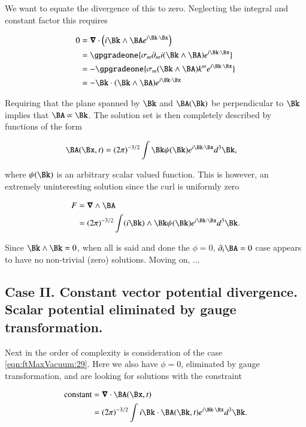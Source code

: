 We want to equate the divergence of this to zero.  Neglecting the integral and constant factor this requires

\begin{align*}
0 
&= 
\spacegrad \cdot \left( i \Bk \wedge \BA e^{i\Bk \cdot \Bx} \right) \\
&= 
\gpgradeone{ \sigma_m \partial_m i (\Bk \wedge \BA) e^{i\Bk \cdot \Bx} } \\
&= 
-\gpgradeone{ \sigma_m (\Bk \wedge \BA) k^m e^{i\Bk \cdot \Bx} } \\
&= 
-\Bk \cdot (\Bk \wedge \BA) e^{i\Bk \cdot \Bx} \\
\end{align*}

Requiring that the plane spanned by $\Bk$ and $\BA(\Bk)$ be perpendicular to $\Bk$ implies that $\BA \propto \Bk$.  The solution set is then completely described by functions of the form

\begin{align}\label{eqn:ftMaxVacuum:53}
\BA(\Bx, t) &= (2 \pi)^{-3/2} \int \Bk \psi(\Bk) e^{i \Bk \cdot \Bx } d^3 \Bk,
\end{align}

where $\psi(\Bk)$ is an arbitrary scalar valued function.  This is however, an extremely uninteresting solution since the curl is uniformly zero

\begin{align*}
F 
&= \spacegrad \wedge \BA \\
&= (2 \pi)^{-3/2} \int (i \Bk) \wedge \Bk \psi(\Bk) e^{i \Bk \cdot \Bx } d^3 \Bk.
\end{align*}

Since $\Bk \wedge \Bk = 0$, when all is said and done the $\phi = 0$, $\partial_t \BA = 0$ case appears to have no non-trivial (zero) solutions.  Moving on, ...

\subsection{Case II.  Constant vector potential divergence.  Scalar potential eliminated by gauge transformation.}

Next in the order of complexity is consideration of the case \autoref{eqn:ftMaxVacuum:29}.  Here we also have $\phi = 0$, eliminated by gauge transformation, and are looking for solutions with the constraint

\begin{align*}
\text{constant} 
&= \spacegrad \cdot \BA(\Bx, t) \\
&= (2 \pi)^{-3/2} \int i \Bk \cdot \BA(\Bk, t) e^{i \Bk \cdot \Bx } d^3 \Bk.
\end{align*}

